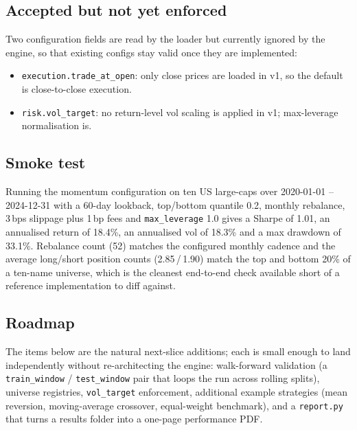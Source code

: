 \documentclass[11pt]{article}
\begin{document}
\subsection*{Accepted but not yet enforced}
Two configuration fields are read by the loader but currently ignored
by the engine, so that existing configs stay valid once they are
implemented:

\begin{itemize}
    \item \texttt{execution.trade\_at\_open}: only close prices are
          loaded in v1, so the default is close-to-close execution.
    \item \texttt{risk.vol\_target}: no return-level vol scaling is
          applied in v1; max-leverage normalisation is.
\end{itemize}

\subsection*{Smoke test}
Running the momentum configuration on ten US large-caps over
2020-01-01 -- 2024-12-31 with a 60-day lookback, top/bottom quantile
0.2, monthly rebalance, 3\,bps slippage plus 1\,bp fees and
\texttt{max\_leverage} 1.0 gives a Sharpe of 1.01, an annualised return
of 18.4\%, an annualised vol of 18.3\% and a max drawdown of 33.1\%.
Rebalance count (52) matches the configured monthly cadence and the
average long/short position counts (2.85\,/\,1.90) match the top and
bottom 20\% of a ten-name universe, which is the cleanest end-to-end
check available short of a reference implementation to diff against.

\subsection*{Roadmap}
The items below are the natural next-slice additions; each is small
enough to land independently without re-architecting the engine:
walk-forward validation (a \texttt{train\_window} / \texttt{test\_window}
pair that loops the run across rolling splits), universe registries,
\texttt{vol\_target} enforcement, additional example strategies
(mean reversion, moving-average crossover, equal-weight benchmark),
and a \texttt{report.py} that turns a results folder into a one-page
performance PDF.



\end{document}
